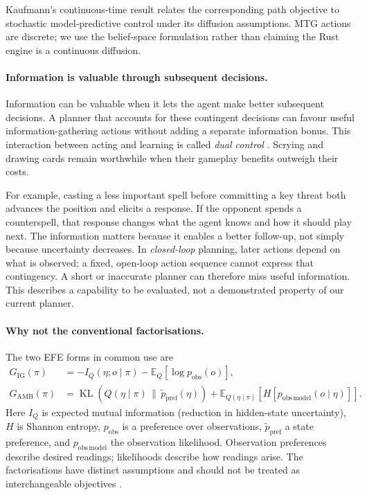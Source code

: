 \documentclass[11pt,a4paper]{article}
\theoremstyle{definition}
\theoremstyle{plain}
\DeclareMathOperator{\KL}{KL}
\begin{document}
Kaufmann's continuous-time result relates the corresponding path objective to stochastic model-predictive control under its diffusion assumptions. MTG actions are discrete; we use the belief-space formulation rather than claiming the Rust engine is a continuous diffusion.

\paragraph{Information is valuable through subsequent decisions.} Information can be valuable when it lets the agent make better subsequent decisions. A planner that accounts for these contingent decisions can favour useful information-gathering actions without adding a separate information bonus. This interaction between acting and learning is called \emph{dual control} \citep{feldbaum1960dual}. Scrying and drawing cards remain worthwhile when their gameplay benefits outweigh their costs.

For example, casting a less important spell before committing a key threat both advances the position and elicits a response. If the opponent spends a counterspell, that response changes what the agent knows and how it should play next. The information matters because it enables a better follow-up, not simply because uncertainty decreases. In \emph{closed-loop} planning, later actions depend on what is observed; a fixed, open-loop action sequence cannot express that contingency. A short or inaccurate planner can therefore miss useful information. This describes a capability to be evaluated, not a demonstrated property of our current planner.

\paragraph{Why not the conventional factorisations.} The two EFE forms in common use are
\begin{align}
G_{\mathrm{IG}}(\pi) &=
 -I_Q(\eta;o\mid\pi)-\mathbb E_Q[\log p_{\mathrm{obs}}(o)], \label{eq:efe1}\\
G_{\mathrm{AMB}}(\pi) &=
 \KL\!\left(Q(\eta\mid\pi)\,\|\,\tilde p_{\mathrm{pref}}(\eta)\right)
 +\mathbb E_{Q(\eta\mid\pi)}[H[p_{\mathrm{obs\,model}}(o\mid\eta)]].
 \label{eq:efe2}
\end{align}
Here $I_Q$ is expected mutual information (reduction in hidden-state uncertainty), $H$ is Shannon entropy, $p_{\mathrm{obs}}$ is a preference over observations, $\tilde p_{\mathrm{pref}}$ a state preference, and $p_{\mathrm{obs\,model}}$ the observation likelihood. Observation preferences describe desired readings; likelihoods describe how readings arise. The factorisations have distinct assumptions and should not be treated as interchangeable objectives \citep{millidge2021whence, kaufmann2026aifcontrol}.
\end{document}
